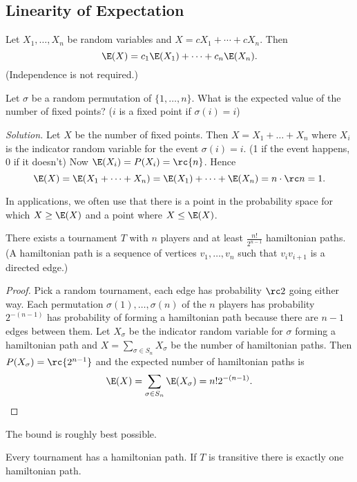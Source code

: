 
\subsection{Linearity of Expectation}

Let $X_1,\ldots, X_n$ be random variables and $X=cX_1+\cdots +cX_n$. Then
\[
\E(X)=c_1\E(X_1)+\cdots +c_n\E(X_n).
\]
(Independence is not required.)

\begin{ex}
Let $\sigma$ be a random permutation of $\{1,\ldots, n\}$. What is the expected value of the number of fixed points? ($i$ is a fixed point if $\sigma(i)=i$)
\end{ex}
{\it Solution.} Let $X$ be the number of fixed points. Then $X=X_1+\ldots+ X_n$ where $X_i$ is the indicator random variable for the event $\sigma(i)=i$. (1 if the event happens, 0 if it doesn't) Now $\E(X_i)=P(X_i)=\rc{n}$. Hence
\[
\E(X)=\E(X_1+\cdots +X_n)=\E(X_1)+\cdots +\E(X_n)=n\cdot \rc n=1.
\]

In applications, we often use that there is a point in the probability space for which $X\geq \E(X)$ and a point where $X\leq \E(X)$.

\begin{thm}
There exists a tournament $T$ with $n$ players and at least $\frac{n!}{2^{n-1}}$ hamiltonian paths. (A hamiltonian path is a sequence of vertices $v_1,\ldots, v_n$ such that $v_iv_{i+1}$ is a directed edge.)
\end{thm}
\begin{proof}
Pick a random tournament, each edge has probability $\rc2 $ going either way. 
Each permutation $\sigma(1),\ldots, \sigma(n)$ of the $n$ players has probability $2^{-(n-1)}$ has probability of forming a hamiltonian path because there are $n-1$ edges between them. Let $X_{\sigma}$ be the indicator random variable for $\sigma$ forming a hamiltonian path and $X=\sum_{\sigma\in S_n} X_{\sigma}$ be the number of hamiltonian paths. Then $P(X_{\sigma})=\rc{2^{n-1}}$ and the expected number of hamiltonian paths is
\[
\E(X)=\sum_{\sigma\in S_n}\E(X_{\sigma})=n!2^{-(n-1)}.
\]
\end{proof}
\begin{rem}
The bound is roughly best possible.

Every tournament has a hamiltonian path. If $T$ is transitive there is exactly one hamiltonian path.
\end{rem}

